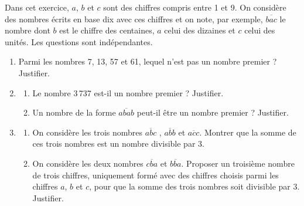 \begin{exercice}[CRPE 2009 G2] %
   Dans cet exercice, $a$, $b$ et $c$ sont des chiffres compris entre 1 et 9. On considère des nombres écrits en base dix avec ces chiffres et on note, par exemple, $\overline{bac}$ le nombre dont $b$ est le chiffre des centaines, $a$ celui des dizaines et $c$ celui des unités. Les questions sont indépendantes.
   \begin{enumerate}
      \item Parmi les nombres 7, 13, 57 et 61, lequel n'est pas un nombre premier ? Justifier.
      \item
      \begin{enumerate}
         \item Le nombre 3\,737 est-il un nombre premier ? Justifier.
         \item Un nombre de la forme $\overline{abab}$ peut-il être un nombre premier ? Justifier.
      \end{enumerate}
      \item 
      \begin{enumerate}
         \item On considère les trois nombres $\overline{abc}$ , $\overline{abb}$ et $\overline{acc}$. Montrer que la somme de ces trois nombres est un nombre divisible par 3.
         \item On considère les deux nombres $\overline{cba}$ et $\overline{bba}$. Proposer un troisième nombre de trois chiffres, uniquement formé avec des chiffres choisis parmi les chiffres $a$, $b$ et $c$, pour que la somme des trois nombres soit divisible par 3. Justifier.
      \end{enumerate}
   \end{enumerate}
\end{exercice}

